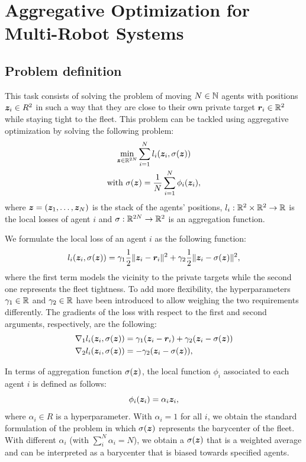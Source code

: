 \documentclass[a4paper,11pt,oneside]{book}
\begin{document}
\chapter{Aggregative Optimization for Multi-Robot Systems} \label{ch:aggregative}


\section{Problem definition}

This task consists of solving the problem of moving $N \in {\mathbb{N}}$ agents with positions ${\bm{z}}_i \in R^2$ in such a way that they are close to their own private target ${\bm{r}}_i \in {\mathbb{R}}^2$ while staying tight to the fleet. This problem can be tackled using aggregative optimization by solving the following problem:
\[
      \begin{gathered}
            \min_{{\bm{z}} \in {\mathbb{R}}^{2N}} \sum_{i=1}^{N} l_i({\bm{z}}_i, \sigma({\bm{z}})) \\
            \text{with } \sigma({\bm{z}}) = \frac{1}{N} \sum_{i=1}^{N} \phi_i({\bm{z}}_i),
      \end{gathered}
\]
where ${\bm{z}}=({\bm{z}}_1, \dots, {\bm{z}}_N)$ is the stack of the agents' positions, $l_i: {\mathbb{R}}^2 \times {\mathbb{R}}^2 \rightarrow {\mathbb{R}}$ is the local losses of agent $i$ and $\sigma: {\mathbb{R}}^{2N} \rightarrow {\mathbb{R}}^2$ is an aggregation function.

We formulate the local loss of an agent $i$ as the following function:
\[
      l_i({\bm{z}}_i, \sigma({\bm{z}})) = \gamma_1 \frac{1}{2} \Vert {\bm{z}}_i - {\bm{r}}_i \Vert^2 + \gamma_2 \frac{1}{2} \Vert {\bm{z}}_i - \sigma({\bm{z}}) \Vert^2,
\]
where the first term models the vicinity to the private targets while the second one represents the fleet tightness. To add more flexibility, the hyperparameters $\gamma_1 \in {\mathbb{R}}$ and $\gamma_2 \in {\mathbb{R}}$ have been introduced to allow weighing the two requirements differently. The gradients of the loss with respect to the first and second arguments, respectively, are the following:
\[
      \begin{split}
            \nabla_1 l_i({\bm{z}}_i, \sigma({\bm{z}})) &= \gamma_1 ({\bm{z}}_i - {\bm{r}}_i) + \gamma_2 ({\bm{z}}_i - \sigma({\bm{z}})) \\
            \nabla_2 l_i({\bm{z}}_i, \sigma({\bm{z}})) &= -\gamma_2 ({\bm{z}}_i - \sigma({\bm{z}})),
      \end{split}
\]

In terms of aggregation function $\sigma({\bm{z}})$, the local function $\phi_i$ associated to each agent $i$ is defined as follows:
\[
      \phi_i({\bm{z}}_i) = \alpha_i {\bm{z}}_i,
\]
where $\alpha_i \in R$ is a hyperparameter. With $\alpha_i = 1$ for all $i$, we obtain the standard formulation of the problem in which $\sigma({\bm{z}})$ represents the barycenter of the fleet. With different $\alpha_i$ (with $\sum_i^N \alpha_i = N$), we obtain a $\sigma({\bm{z}})$ that is a weighted average and can be interpreted as a barycenter that is biased towards specified agents.
\end{document}
